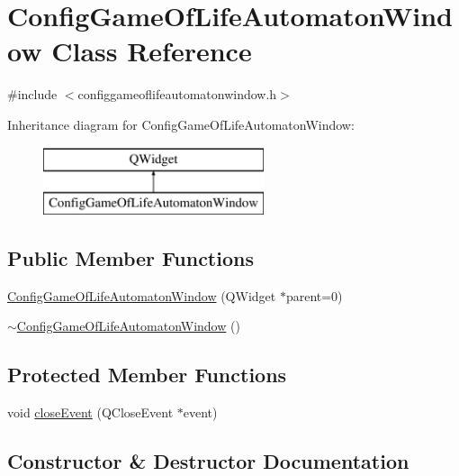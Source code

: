 \hypertarget{class_config_game_of_life_automaton_window}{}\section{Config\+Game\+Of\+Life\+Automaton\+Window Class Reference}
\label{class_config_game_of_life_automaton_window}


{\ttfamily \#include $<$configgameoflifeautomatonwindow.\+h$>$}

Inheritance diagram for Config\+Game\+Of\+Life\+Automaton\+Window\+:\begin{figure}[H]
\begin{center}
\leavevmode
\includegraphics[height=2.000000cm]{class_config_game_of_life_automaton_window}
\end{center}
\end{figure}
\subsection*{Public Member Functions}
\begin{DoxyCompactItemize}
\item 
\mbox{\hyperlink{class_config_game_of_life_automaton_window_afc610b98a84e5c61cc0f2b4a0c4e0dff}{Config\+Game\+Of\+Life\+Automaton\+Window}} (Q\+Widget $\ast$parent=0)
\item 
\mbox{\hyperlink{class_config_game_of_life_automaton_window_a6cfdbc3a6368dc0560f6c70467713493}{$\sim$\+Config\+Game\+Of\+Life\+Automaton\+Window}} ()
\end{DoxyCompactItemize}
\subsection*{Protected Member Functions}
\begin{DoxyCompactItemize}
\item 
void \mbox{\hyperlink{class_config_game_of_life_automaton_window_a56bf84ca5e45eccd7b1b12068efe3563}{close\+Event}} (Q\+Close\+Event $\ast$event)
\end{DoxyCompactItemize}


\subsection{Constructor \& Destructor Documentation}
\mbox{\label{class_config_game_of_life_automaton_window_afc610b98a84e5c61cc0f2b4a0c4e0dff}} 
